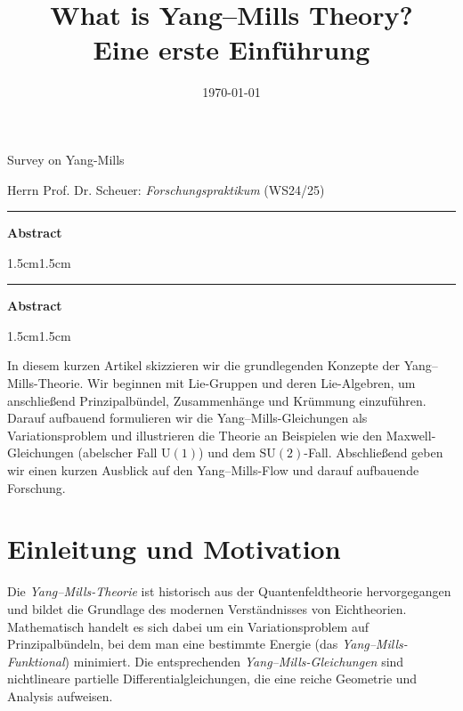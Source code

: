 \documentclass[10pt, letterpaper]{article}
\renewenvironment{abstract}
  {\small
   \begin{center}
   \normalfont\abstractname\vspace{-0.5em}\vspace{0pt} %
   \end{center}
   \list{}{%
     \setlength{\leftmargin}{0mm}%
     \setlength{\rightmargin}{\leftmargin}%
   }%
   \item\relax}
  {\endlist}
\theoremstyle{custom}
\theoremstyle{definition}
\renewenvironment{abstract}
  {
    \begin{center}
      \normalfont\bfseries Abstract
    \end{center}
    \begin{adjustwidth}{1.5cm}{1.5cm}
    \small
  }
  {
    \end{adjustwidth}
  }
\begin{document}
\begin{center}
    \Large{Survey on Yang-Mills}\\[10pt]
\end{center}
\begin{center}
    {Herrn Prof. Dr. Scheuer: \textit{Forschungspraktikum} (WS24/25)}
\end{center}

\rule{\textwidth}{0.5pt}
\begin{abstract}
\end{abstract}
\rule{\textwidth}{0.5pt}
\vspace{0.5cm}

\tableofcontents



\pagebreak

\title{\textbf{What is Yang--Mills Theory? \\ \large Eine erste Einführung}}
\author{}
\date{\today}
\maketitle


\begin{abstract}
In diesem kurzen Artikel skizzieren wir die grundlegenden Konzepte der Yang--Mills-Theorie. Wir beginnen mit Lie-Gruppen und deren Lie-Algebren, um anschließend Prinzipalbündel, Zusammenhänge und Krümmung einzuführen. Darauf aufbauend formulieren wir die Yang--Mills-Gleichungen als Variationsproblem und illustrieren die Theorie an Beispielen wie den Maxwell-Gleichungen (abelscher Fall \(\mathrm{U}(1)\)) und dem \(\mathrm{SU}(2)\)-Fall. Abschließend geben wir einen kurzen Ausblick auf den Yang--Mills-Flow und darauf aufbauende Forschung.
\end{abstract}



\section{Einleitung und Motivation}
Die \emph{Yang--Mills-Theorie} ist historisch aus der Quantenfeldtheorie hervorgegangen und bildet die Grundlage des modernen Verständnisses von Eichtheorien. Mathematisch handelt es sich dabei um ein Variationsproblem auf Prinzipalbündeln, bei dem man eine bestimmte Energie (das \emph{Yang--Mills-Funktional}) minimiert. Die entsprechenden \emph{Yang--Mills-Gleichungen} sind nichtlineare partielle Differentialgleichungen, die eine reiche Geometrie und Analysis aufweisen.
\end{document}
